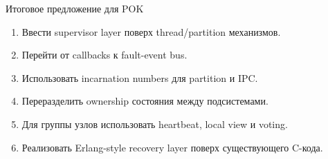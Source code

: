 \begin{frame}{Итоговое предложение для POK}
	\begin{enumerate}
		\item Ввести supervisor layer поверх thread/partition механизмов.
		\item Перейти от callbacks к fault-event bus.
		\item Использовать incarnation numbers для partition и IPC.
		\item Переразделить ownership состояния между подсистемами.
		\item Для группы узлов использовать heartbeat, local view и voting.
		\item Реализовать Erlang-style recovery layer поверх существующего C-кода.
	\end{enumerate}
\end{frame}